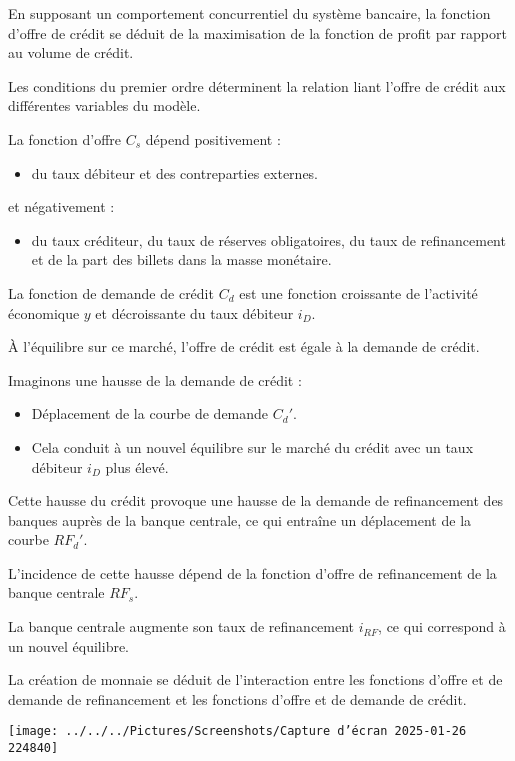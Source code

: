 \documentclass[a4paper, 12pt]{report}
\begin{document}
En supposant un comportement concurrentiel du système bancaire, la fonction d'offre de crédit se déduit de la maximisation de la fonction de profit par rapport au volume de crédit.  

Les conditions du premier ordre déterminent la relation liant l'offre de crédit aux différentes variables du modèle.

La fonction d'offre \( C_s \) dépend positivement :  
\begin{itemize}
	\item du taux débiteur et des contreparties externes.
\end{itemize}

et négativement :  
\begin{itemize}
	\item du taux créditeur, du taux de réserves obligatoires, du taux de refinancement et de la part des billets dans la masse monétaire.
\end{itemize}

La fonction de demande de crédit \( C_d \) est une fonction croissante de l'activité économique \( y \) et décroissante du taux débiteur \( i_D \).  

À l'équilibre sur ce marché, l'offre de crédit est égale à la demande de crédit.  

Imaginons une hausse de la demande de crédit :  
\begin{itemize}
	\item Déplacement de la courbe de demande \( C_d' \).
	\item Cela conduit à un nouvel équilibre sur le marché du crédit avec un taux débiteur \( i_D \) plus élevé.
\end{itemize}

Cette hausse du crédit provoque une hausse de la demande de refinancement des banques auprès de la banque centrale, ce qui entraîne un déplacement de la courbe \( RF_d' \).  

L'incidence de cette hausse dépend de la fonction d'offre de refinancement de la banque centrale \( RF_s \).  

La banque centrale augmente son taux de refinancement \( i_{RF} \), ce qui correspond à un nouvel équilibre.  

La création de monnaie se déduit de l'interaction entre les fonctions d'offre et de demande de refinancement et les fonctions d'offre et de demande de crédit.

	
\begin{center}
	\texttt{[image: ../../../Pictures/Screenshots/Capture d'écran 2025-01-26 224840]}
\end{center}
\end{document}

